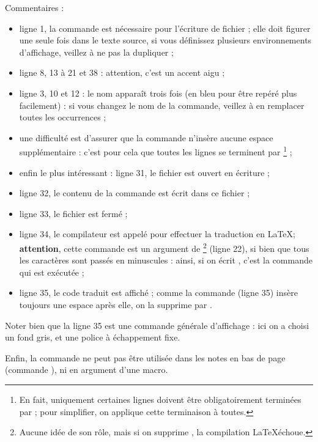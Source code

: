 Commentaires :
\begin{itemize}
  \item ligne 1, la commande  est nécessaire pour l'écriture de fichier ; elle doit figurer une seule fois dans le texte source, si vous définissez plusieurs environnements d'affichage, veillez à ne pas la dupliquer ; 
  \item ligne 8, 13 à 21 et 38 : attention, c'est un accent aigu \tpp{\`{}} ;
  \item ligne 3, 10 et 12 : le nom  apparaît trois fois (en bleu pour être repéré plus facilement) : si vous changez le nom de la commande, veillez à en remplacer toutes les occurrences ;
  \item une difficulté est d'assurer que la commande n'insère aucune espace supplémentaire : c'est pour cela que toutes les lignes se terminent par \tpp{\%}\footnote{En fait, uniquement certaines lignes doivent être obligatoirement terminées par \tpp{\%} ; pour simplifier, on applique cette terminaison à toutes.} ;
    \item enfin le plus intéressant : ligne 31, le fichier  est ouvert en écriture ;
    \item ligne 32, le contenu de la commande est écrit dans ce fichier ;
    \item ligne 33, le fichier est fermé ;
    \item ligne 34, le compilateur est appelé pour effectuer la traduction en \LaTeX ; {\bf attention}, cette commande est un argument de \footnote{Aucune idée de son rôle, mais si on supprime , la compilation \LaTeX échoue.} (ligne 22), si bien que tous les caractères sont passés en minuscules : ainsi, si on écrit , c'est la commande   qui est exécutée ;
    \item ligne 35, le code traduit est affiché ; comme la commande  (ligne 35) insère toujours une espace après elle, on la supprime par .
\end{itemize}

Noter bien que la ligne 35 est une commande générale d'affichage : ici on a choisi un fond gris, et une police à échappement fixe.

Enfin, la commande  ne peut pas être utilisée dans les notes en bas de page (commande ), ni en argument d'une macro.


